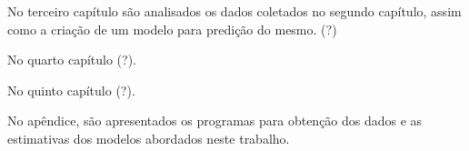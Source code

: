 No terceiro capítulo são analisados os dados coletados no segundo capítulo, assim como a criação de um modelo para predição do mesmo. (?)

No quarto capítulo (?).

No quinto capítulo (?). %

No apêndice, são apresentados os programas para obtenção dos dados e as estimativas dos modelos abordados neste trabalho.

